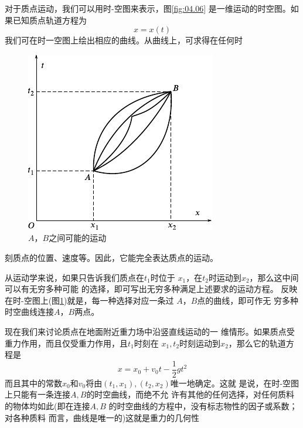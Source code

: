 对于质点运动，我们可以用时-空图来表示，图\ref{fig:04.06}
是一维运动的时空图。如果已知质点轨道方程为
\begin{equation*}
  x = x \left( t \right)
\end{equation*}
我们可在时一空图上绘出相应的曲线。从曲线上，可求得在任何时
\begin{figure}
    \vspace{-1em}
    \centering
    \includegraphics{figure/fig04.07}
    \caption{$ A $，$ B $之间可能的运动}
    \label{fig:04.07}
\end{figure}
刻质点的位置、速度等。因此，它能完全表达质点的运动。

从运动学来说，如果只告诉我们质点在$ t_1 $时位于
$ x_1 $，在$ t_2 $时运动到$ x_2 $，那么这中间可以有无穷多种可能
的选择，即可写出无穷多种满足上述要求的运动方程。
反映在时-空图上(图\ref{fig:04.07})就是，每一种选择对应一条过
$ A $，$ B $点的曲线，即可作无
穷多种时空曲线连接$ A $，$ B $两点。

现在我们来讨论质点在地面附近重力场中沿竖直线运动的一
维情形。如果质点受重力作用，而且仅受重力作用，且$  t _ { 1 }   $时刻在
$ x _ { 1 }   ,  t _ { 2 }   $时刻运动到$  x _ { 2 }   $，那么它的轨道方程是
\begin{equation*}
  x = x _ { 0 } + v _ { 0 } t - \frac { 1 } { 2 } g t ^ { 2 }
\end{equation*}
而且其中的常数$ x _ { 0 } $和$  v _ { 0 }  $将由$  \left( t _ { 1 }, x _ { 1 } \right)   ,  \left( t _ { 2 } , x _ { 2 } \right)   $唯一地确定。这就
是说，在时-空图上只能有一条连接$ A , B $的时空曲线，而绝不允
许有其他的任何选择，对任何质料的物体均如此(即在连接$ A , B $
的时空曲线的方程中，没有标志物性的因子或系数；对各种质料
而言，曲线是唯一的)这就是重力的几何性

